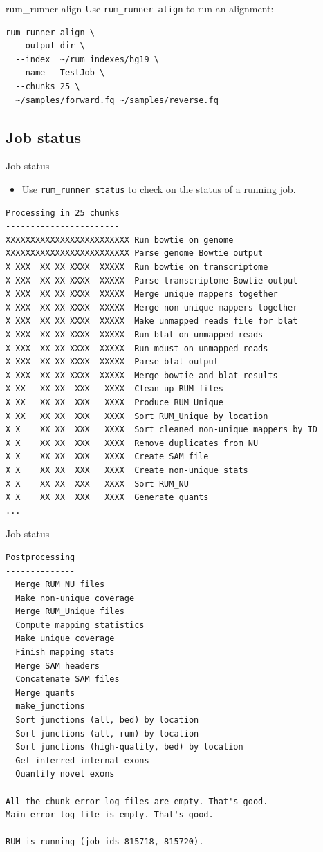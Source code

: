 \documentclass{beamer}
\begin{document}
\begin{frame}[fragile]{rum\_runner align}
Use \texttt{rum\_runner align} to run an alignment:
\begin{verbatim}
rum_runner align \
  --output dir \
  --index  ~/rum_indexes/hg19 \
  --name   TestJob \
  --chunks 25 \
  ~/samples/forward.fq ~/samples/reverse.fq
\end{verbatim}
\end{frame}


\subsection{Job status}

\begin{frame}[fragile]{Job status}
  \begin{itemize}
  \item Use \texttt{rum\_runner status} to check on the status of a
    running job.
  \end{itemize}
  \tiny
\begin{verbatim}
Processing in 25 chunks
-----------------------
XXXXXXXXXXXXXXXXXXXXXXXXX Run bowtie on genome
XXXXXXXXXXXXXXXXXXXXXXXXX Parse genome Bowtie output
X XXX  XX XX XXXX  XXXXX  Run bowtie on transcriptome
X XXX  XX XX XXXX  XXXXX  Parse transcriptome Bowtie output
X XXX  XX XX XXXX  XXXXX  Merge unique mappers together
X XXX  XX XX XXXX  XXXXX  Merge non-unique mappers together
X XXX  XX XX XXXX  XXXXX  Make unmapped reads file for blat
X XXX  XX XX XXXX  XXXXX  Run blat on unmapped reads
X XXX  XX XX XXXX  XXXXX  Run mdust on unmapped reads
X XXX  XX XX XXXX  XXXXX  Parse blat output
X XXX  XX XX XXXX  XXXXX  Merge bowtie and blat results
X XX   XX XX  XXX   XXXX  Clean up RUM files
X XX   XX XX  XXX   XXXX  Produce RUM_Unique
X XX   XX XX  XXX   XXXX  Sort RUM_Unique by location
X X    XX XX  XXX   XXXX  Sort cleaned non-unique mappers by ID
X X    XX XX  XXX   XXXX  Remove duplicates from NU
X X    XX XX  XXX   XXXX  Create SAM file
X X    XX XX  XXX   XXXX  Create non-unique stats
X X    XX XX  XXX   XXXX  Sort RUM_NU
X X    XX XX  XXX   XXXX  Generate quants
...
\end{verbatim}
\end{frame}

\begin{frame}[fragile]{Job status}
\tiny
\begin{verbatim}
Postprocessing
--------------
  Merge RUM_NU files
  Make non-unique coverage
  Merge RUM_Unique files
  Compute mapping statistics
  Make unique coverage
  Finish mapping stats
  Merge SAM headers
  Concatenate SAM files
  Merge quants
  make_junctions
  Sort junctions (all, bed) by location
  Sort junctions (all, rum) by location
  Sort junctions (high-quality, bed) by location
  Get inferred internal exons
  Quantify novel exons

All the chunk error log files are empty. That's good.
Main error log file is empty. That's good.

RUM is running (job ids 815718, 815720).
\end{verbatim}
\end{frame}
\end{document}
